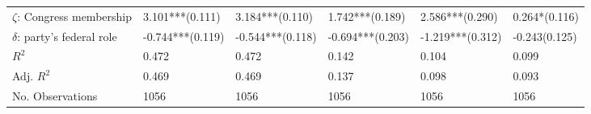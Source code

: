 \begin{table}[h]
\begin{adjustbox}{width=\linewidth, center}
\begin{tabular}{llllll}
	$\zeta$: Congress membership   &            \phantom{-}3.101***(0.111) &                                \phantom{-}3.184***(0.110) &            \phantom{-}1.742***(0.189) &                                \phantom{-}2.586***(0.290) &            \phantom{-}0.264*\phantom{*}\phantom{*}(0.116) \\
	$\delta$: party's federal role &                      -0.744***(0.119) &                                          -0.544***(0.118) &                      -0.694***(0.203) &                                          -1.219***(0.312) &            -0.243\phantom{*}\phantom{*}\phantom{*}(0.125) \\
	$R^2$                          &                                 0.472 &                                                     0.472 &                                 0.142 &                                                     0.104 &                                                     0.099 \\
	Adj. $R^2$                     &                                 0.469 &                                                     0.469 &                                 0.137 &                                                     0.098 &                                                     0.093 \\
	No. Observations               &                                  1056 &                                                      1056 &                                  1056 &                                                      1056 &                                                      1056 \\
	\bottomrule
	\end{tabular}
	
\end{adjustbox}
	\end{table}

